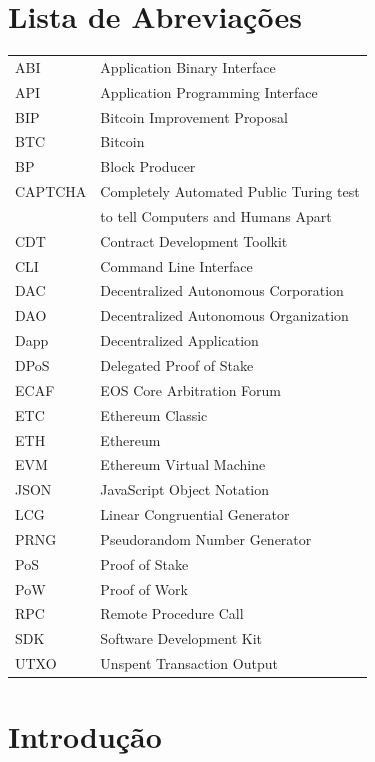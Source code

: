 \documentclass[a4paper,12pt]{monografia}
\theoremstyle{plain}
\theoremstyle{definition}
\theoremstyle{remark}
\begin{document}
\tableofcontents
\thispagestyle{empty}
\listoffigures
\thispagestyle{empty}

\chapter*{Lista de Abrevia\c{c}\~oes} 
\doublespacing  \begin{tabular}{l l}
ABI  & Application Binary Interface\\
API  & Application Programming Interface\\
BIP  & Bitcoin Improvement Proposal\\
BTC  & Bitcoin\\
BP   & Block Producer\\
CAPTCHA & Completely Automated Public Turing test\\
    & to tell Computers and Humans Apart\\
CDT  & Contract Development Toolkit\\
CLI  & Command Line Interface\\
DAC  & Decentralized Autonomous Corporation\\
DAO  & Decentralized Autonomous Organization\\
Dapp & Decentralized Application\\
DPoS & Delegated Proof of Stake\\
ECAF & EOS Core Arbitration Forum\\
ETC  & Ethereum Classic\\
ETH  & Ethereum\\
EVM  & Ethereum Virtual Machine\\
JSON & JavaScript Object Notation\\
LCG  & Linear Congruential Generator\\
PRNG & Pseudorandom Number Generator\\
PoS  & Proof of Stake\\
PoW  & Proof of Work\\
RPC  & Remote Procedure Call\\
SDK  & Software Development Kit\\
UTXO & Unspent Transaction Output\\
\end{tabular}  \thispagestyle{empty}

\pagestyle{ruledheader}

\chapter{Introdu\c{c}\~ao}
\end{document}
